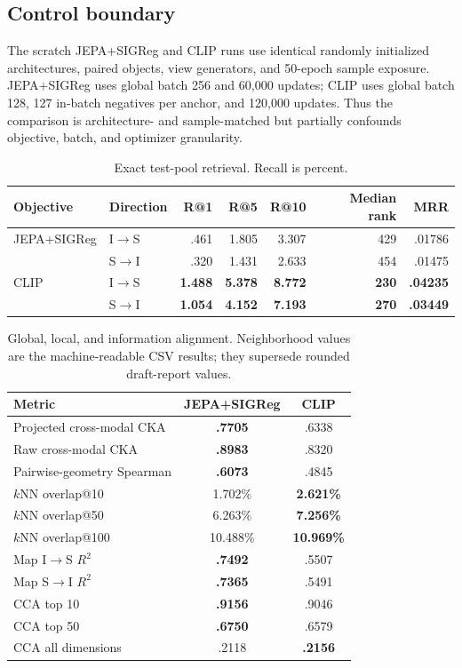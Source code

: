 \documentclass{article}
\newcommand{\rscore}{$R^2$}
\begin{document}
\subsection{Control boundary}

The scratch JEPA+SIGReg and CLIP runs use identical randomly initialized
architectures, paired objects, view generators, and 50-epoch sample exposure.
JEPA+SIGReg uses global batch 256 and 60,000 updates; CLIP uses global batch 128,
127 in-batch negatives per anchor, and 120,000 updates.
Thus the comparison is architecture- and sample-matched but partially confounds
objective, batch, and optimizer granularity.

\begin{table}[h]
\centering
\caption{Exact test-pool retrieval. Recall is percent.}
\label{tab:clip_retrieval}
\small
\begin{tabular}{llrrrrr}
\toprule
Objective & Direction & R@1 & R@5 & R@10 & Median rank & MRR\\
\midrule
JEPA+SIGReg & I$\rightarrow$S & .461 & 1.805 & 3.307 & 429 & .01786\\
& S$\rightarrow$I & .320 & 1.431 & 2.633 & 454 & .01475\\
CLIP & I$\rightarrow$S & \textbf{1.488} & \textbf{5.378} & \textbf{8.772} & \textbf{230} & \textbf{.04235}\\
& S$\rightarrow$I & \textbf{1.054} & \textbf{4.152} & \textbf{7.193} & \textbf{270} & \textbf{.03449}\\
\bottomrule
\end{tabular}
\end{table}

\begin{table}[h]
\centering
\caption{Global, local, and information alignment. Neighborhood values are the
machine-readable CSV results; they supersede rounded draft-report values.}
\label{tab:clip_geometry}
\small
\setlength{\tabcolsep}{4.5pt}
\begin{tabular}{lcc}
\toprule
Metric & JEPA+SIGReg & CLIP\\
\midrule
Projected cross-modal CKA & \textbf{.7705} & .6338\\
Raw cross-modal CKA & \textbf{.8983} & .8320\\
Pairwise-geometry Spearman & \textbf{.6073} & .4845\\
$k$NN overlap@10 & 1.702\% & \textbf{2.621\%}\\
$k$NN overlap@50 & 6.263\% & \textbf{7.256\%}\\
$k$NN overlap@100 & 10.488\% & \textbf{10.969\%}\\
Map I$\rightarrow$S \rscore & \textbf{.7492} & .5507\\
Map S$\rightarrow$I \rscore & \textbf{.7365} & .5491\\
CCA top 10 & \textbf{.9156} & .9046\\
CCA top 50 & \textbf{.6750} & .6579\\
CCA all dimensions & .2118 & \textbf{.2156}\\
\bottomrule
\end{tabular}
\end{table}
\end{document}
